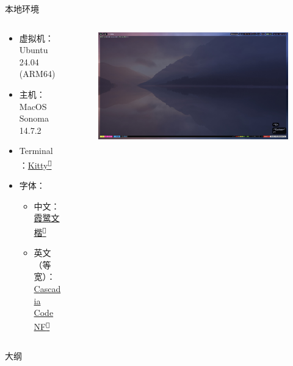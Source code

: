 \documentclass[aspectratio=169]{ctexbeamer}
\newcommand{\nerd}[1]{\texttt{#1}}
\newcommand{\link}[3][]{\href{#3}{#2\textsuperscript{\nerd{}}}}
\begin{document}
\begin{frame}{本地环境}
  \begin{columns}
    \begin{column}{0.5\linewidth}
      \begin{itemize}
        \item 虚拟机：Ubuntu 24.04 (ARM64)
        \item 主机：MacOS Sonoma 14.7.2
        \item Terminal：\link{Kitty}{https://github.com/kovidgoyal/kitty}
        \item 字体：
          \begin{itemize}
            \item 中文：\link{霞鹭文楷}{https://github.com/kovidgoyal/kitty}
            \item 英文（等宽）：\link{Cascadia Code NF}{https://github.com/microsoft/cascadia-code}
          \end{itemize}
      \end{itemize}
    \end{column}

    \begin{column}{0.5\linewidth}
      \begin{figure}[H]
        \centering
        \includegraphics[width=\linewidth]{./Figures/Screenshot.jpg}
      \end{figure}
    \end{column}
  \end{columns}
\end{frame}

\begin{frame}{大纲}
  \tableofcontents
\end{frame}
\end{document}
